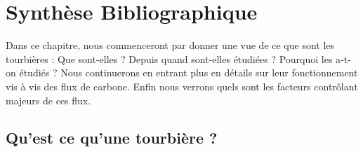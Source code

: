 
%	
%

\chapter{Synth\`{e}se Bibliographique}
\newpage


Dans ce chapitre, nous commenceront par donner une vue de ce que sont les tourbières : Que sont-elles ? Depuis quand sont-elles étudiées ? Pourquoi les a-t-on étudiés ?
Nous continuerons en entrant plus en détails sur leur fonctionnement vis à vis des flux de carbone.
Enfin nous verrons quels sont les facteurs contrôlant majeurs de ces flux.

\section{Qu'est ce qu'une tourbière ?}

